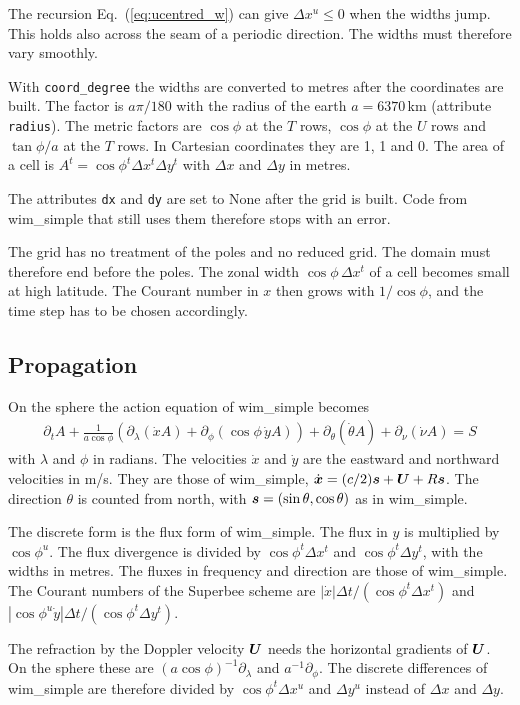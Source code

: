 \documentclass[12pt]{article}
\newcommand{\beq}  { \begin{eqnarray} }
\newcommand{\eeq}  { \end{eqnarray}}
\newcommand{\eq }  [1]{Eq.~(\ref{#1})}  %
\renewcommand{\v}[1]{{\mbox{\boldmath$ #1 $}}}  %
\newcommand{\pt}[1]{{\partial_t #1}}
\newcommand{\p}{{\partial}}
\newcommand{\lk}{\left(}
\newcommand{\rk}{\right)}
\begin{document}
The recursion \eq{eq:ucentred_w} can give $\Delta x^u \le 0$ when the widths jump.
This holds also across the seam of a periodic direction.
The widths must therefore vary smoothly.

With \verb|coord_degree| the widths are converted to metres after the coordinates are built.
The factor is $a \pi /180$ with the radius of the earth $a = 6370\,$km (attribute \verb|radius|).
The metric factors are $\cos \phi$ at the $T$ rows, $\cos \phi$ at the $U$ rows and $\tan \phi /a$ at the $T$ rows.
In Cartesian coordinates they are 1, 1 and 0.
The area of a cell is $A^t = \cos \phi^t \Delta x^t \Delta y^t$ with $\Delta x$ and $\Delta y$ in metres.

The attributes \verb|dx| and \verb|dy| are set to None after the grid is built.
Code from wim\_simple that still uses them therefore stops with an error.

The grid has no treatment of the poles and no reduced grid.
The domain must therefore end before the poles.
The zonal width $\cos \phi\, \Delta x^t$ of a cell becomes small at high latitude.
The Courant number in $x$ then grows with $1/\cos \phi$, and the time step has to be chosen accordingly.

\subsection*{Propagation}

On the sphere the action equation of wim\_simple becomes
\beq
 \pt A + \frac{1}{a \cos \phi} \lk \p_\lambda (\dot x A) + \p_\phi (\cos \phi\, \dot y A) \rk
 + \p_\theta (\dot \theta A) + \p_\nu (\dot \nu A) = S
\eeq
with $\lambda$ and $\phi$ in radians.
The velocities $\dot x$ and $\dot y$ are the eastward and northward velocities in m/s.
They are those of wim\_simple, $\dot{\v x} = (c/2) \v s + \v U + R \v s$.
The direction $\theta$ is counted from north, with $\v s = (\sin \theta, \cos \theta)$ as in wim\_simple.

The discrete form is the flux form of wim\_simple.
The flux in $y$ is multiplied by $\cos \phi^u$.
The flux divergence is divided by $\cos \phi^t \Delta x^t$ and $\cos \phi^t \Delta y^t$, with the widths in metres.
The fluxes in frequency and direction are those of wim\_simple.
The Courant numbers of the Superbee scheme are $|\dot x| \Delta t/(\cos \phi^t \Delta x^t)$ and $|\cos \phi^u \dot y| \Delta t /(\cos \phi^t \Delta y^t)$.

The refraction by the Doppler velocity $\v U$ needs the horizontal gradients of $\v U$.
On the sphere these are $(a \cos \phi)^{-1} \p_\lambda$ and $a^{-1} \p_\phi$.
The discrete differences of wim\_simple are therefore divided by $\cos \phi^t \Delta x^u$ and $\Delta y^u$ instead of $\Delta x$ and $\Delta y$.
\end{document}
